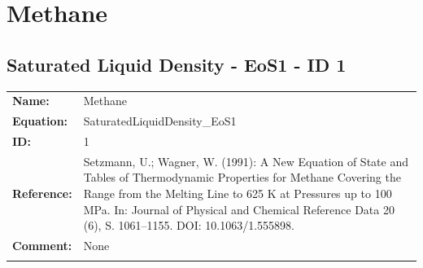 \section{Methane}
%
\subsection{Saturated Liquid Density - EoS1 - ID 1}
%
\begin{tabular}[l]{|lp{11.5cm}|}
\hline
\addlinespace

\textbf{Name:} & Methane \\
\textbf{Equation:} & SaturatedLiquidDensity\_EoS1 \\
\textbf{ID:} & 1 \\
\textbf{Reference:} & Setzmann, U.; Wagner, W. (1991): A New Equation of State and Tables of Thermodynamic Properties for Methane Covering the Range from the Melting Line to 625 K at Pressures up to 100 MPa. In: Journal of Physical and Chemical Reference Data 20 (6), S. 1061–1155. DOI: 10.1063/1.555898. \\
\textbf{Comment:} & None \\

\addlinespace
\hline
\end{tabular}
\newline

